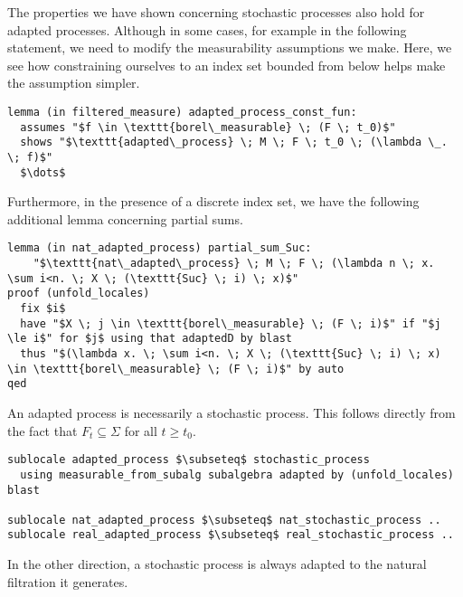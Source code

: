 The properties we have shown concerning stochastic processes also hold for adapted processes. Although in some cases, for example in the following statement, we need to modify the measurability assumptions we make. Here, we see how constraining ourselves to an index set bounded from below helps make the assumption simpler.

\begin{isalemma}
{\small
\begin{lstlisting}[style=isabelle]
lemma (in filtered_measure) adapted_process_const_fun:
  assumes "$f \in \texttt{borel\_measurable} \; (F \; t_0)$"
  shows "$\texttt{adapted\_process} \; M \; F \; t_0 \; (\lambda \_. \; f)$"
  $\dots$
\end{lstlisting}
}
\end{isalemma}

Furthermore, in the presence of a discrete index set, we have the following additional lemma concerning partial sums.

\begin{isalemma}
{\small
\begin{lstlisting}[style=isabelle]
lemma (in nat_adapted_process) partial_sum_Suc: 
	"$\texttt{nat\_adapted\_process} \; M \; F \; (\lambda n \; x. \sum i<n. \; X \; (\texttt{Suc} \; i) \; x)$" 
proof (unfold_locales)
  fix $i$
  have "$X \; j \in \texttt{borel\_measurable} \; (F \; i)$" if "$j \le i$" for $j$ using that adaptedD by blast
  thus "$(\lambda x. \; \sum i<n. \; X \; (\texttt{Suc} \; i) \; x) \in \texttt{borel\_measurable} \; (F \; i)$" by auto
qed
\end{lstlisting}
}
\end{isalemma}

An adapted process is necessarily a stochastic process. This follows directly from the fact that $F_t \subseteq \Sigma$ for all $t \ge t_0$.

\begin{isalemma}
{\small
\begin{lstlisting}[style=isabelle]
sublocale adapted_process $\subseteq$ stochastic_process 
  using measurable_from_subalg subalgebra adapted by (unfold_locales) blast

sublocale nat_adapted_process $\subseteq$ nat_stochastic_process ..
sublocale real_adapted_process $\subseteq$ real_stochastic_process ..
\end{lstlisting}
}
\end{isalemma}


In the other direction, a stochastic process is always adapted to the natural filtration it generates.

